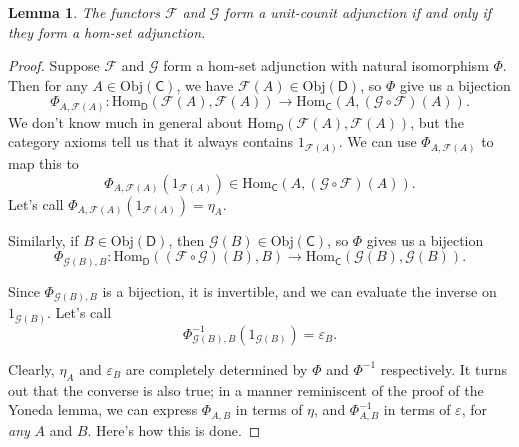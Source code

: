 \documentclass[a4paper,10pt]{scrreprt}
\newcommand{\Obj}{\mathrm{Obj}}
\newcommand{\Hom}{\mathrm{Hom}}
\theoremstyle{definition}
\theoremstyle{plain}
\newtheorem{lemma}{Lemma}[section]
\theoremstyle{remark}
\begin{document}
\begin{lemma}
  The functors $\mathcal{F}$ and $\mathcal{G}$ form a unit-counit adjunction if and only if they form a hom-set adjunction.
\end{lemma}
\begin{proof}
  Suppose $\mathcal{F}$ and $\mathcal{G}$ form a hom-set adjunction with natural isomorphism $\Phi$. Then for any $A \in \Obj(\mathsf{C})$, we have $\mathcal{F}(A) \in \Obj(\mathsf{D})$, so $\Phi$ give us a bijection
  \begin{equation*}
    \Phi_{A, \mathcal{F}(A)}\colon \Hom_{\mathsf{D}}(\mathcal{F}(A), \mathcal{F}(A)) \to \Hom_{\mathsf{C}}(A, (\mathcal{G} \circ \mathcal{F})(A)).
  \end{equation*}
  We don't know much in general about $\Hom_{\mathsf{D}}(\mathcal{F}(A), \mathcal{F}(A))$, but the category axioms tell us that it always contains $1_{\mathcal{F}(A)}$. We can use $\Phi_{A, \mathcal{F}(A)}$ to map this to
  \begin{equation*}
    \Phi_{A, \mathcal{F}(A)}(1_{\mathcal{F}(A)}) \in \Hom_{\mathsf{C}}(A, (\mathcal{G} \circ \mathcal{F})(A)).
  \end{equation*}
  Let's call $\Phi_{A, \mathcal{F}(A)}(1_{\mathcal{F}(A)}) = \eta_{A}$. 

  Similarly, if $B \in \Obj(\mathsf{D})$, then $\mathcal{G}(B) \in \Obj(\mathsf{C})$, so $\Phi$ gives us a bijection
  \begin{equation*}
    \Phi_{\mathcal{G}(B), B}\colon \Hom_{\mathsf{D}}((\mathcal{F} \circ \mathcal{G})(B), B) \to \Hom_{\mathsf{C}}(\mathcal{G}(B), \mathcal{G}(B)).
  \end{equation*}

  Since $\Phi_{\mathcal{G}(B), B}$ is a bijection, it is invertible, and we can evaluate the inverse on $1_{\mathcal{G}(B)}$. Let's call
  \begin{equation*}
    \Phi^{-1}_{\mathcal{G}(B), B}(1_{\mathcal{G}(B)}) = \varepsilon_{B}.
  \end{equation*}

  Clearly, $\eta_{A}$ and $\varepsilon_{B}$ are completely determined by $\Phi$ and $\Phi^{-1}$ respectively. It turns out that the converse is also true; in a manner reminiscent of the proof of the Yoneda lemma, we can express $\Phi_{A, B}$ in terms of $\eta$, and $\Phi^{-1}_{A, B}$ in terms of $\varepsilon$, for \emph{any} $A$ and $B$. Here's how this is done.


\end{proof}
\end{document}
